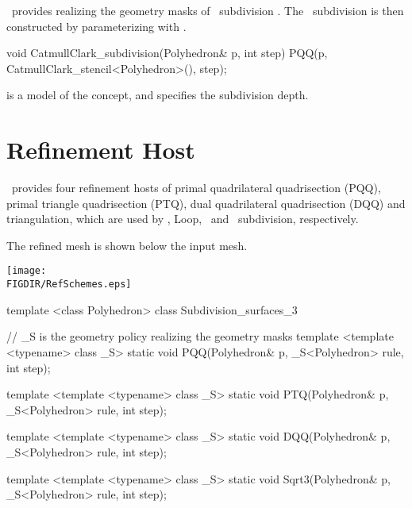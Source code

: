 \ provides  realizing the 
geometry masks of \CC\ subdivision \cite{cgal:cc-sub-78}. 
The \CC\ subdivision is then constructed by parameterizing 
 with 
.

\begin{ccExampleCode}
  void CatmullClark_subdivision(Polyhedron& p, int step) {
    PQQ(p, CatmullClark_stencil<Polyhedron>(), step);
  }
\end{ccExampleCode}

 is a model of the 
concept, and  specifies the subdivision depth.


\section{Refinement Host}
\ provides four refinement hosts of primal 
quadrilateral quadrisection (PQQ), primal triangle 
quadrisection (PTQ), dual quadrilateral 
quadrisection (DQQ) and  triangulation, which 
are used by \CC, Loop, \DS\ and \ subdivision, 
respectively. 

The refined mesh is shown below the input mesh.
\begin{ccTexOnly}
  \begin{center}
    \parbox{0.6\textwidth}{%
      \texttt{[image: \\FIGDIR/RefSchemes.eps]}%
    }
  \end{center}
\end{ccTexOnly}



\begin{ccExampleCode}
template <class Polyhedron>
class Subdivision_surfaces_3 {
  // _S is the geometry policy realizing the geometry masks
  template <template <typename> class _S>
  static void PQQ(Polyhedron& p, _S<Polyhedron> rule, int step);

  template <template <typename> class _S>
  static void PTQ(Polyhedron& p, _S<Polyhedron> rule, int step);

  template <template <typename> class _S>
  static void DQQ(Polyhedron& p, _S<Polyhedron> rule, int step);

  template <template <typename> class _S>
  static void Sqrt3(Polyhedron& p, _S<Polyhedron> rule, int step);
}
\end{ccExampleCode}

